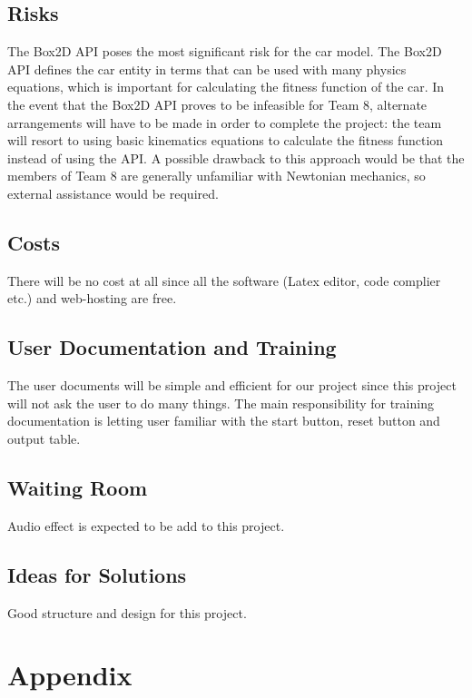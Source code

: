 \documentclass[12pt, titlepage]{article}
\begin{document}
\subsection{Risks}
The Box2D API poses the most signiﬁcant risk for the car model. The Box2D 
API deﬁnes the car entity in terms that can be used with many physics 
equations, which is important for calculating the ﬁtness function of the 
car. In the event that the Box2D API proves to be infeasible for Team 8, 
alternate arrangements will have to be made in order to complete the
project: the team will resort to using basic kinematics equations to calculate 
the ﬁtness function instead of using the API. A possible drawback to this 
approach would be that the members of Team 8 are generally unfamiliar with 
Newtonian mechanics, so external assistance would be required. 

\subsection{Costs}
There will be no cost at all since all the software (Latex editor, code 
complier etc.) and web-hosting are free. 

\subsection{User Documentation and Training}
The user documents will be simple and efficient for our project since this 
project will not ask the user to do many things. The main responsibility for 
training documentation is letting user familiar with the start button, reset 
button and output table.

\subsection{Waiting Room}
Audio effect is expected to be add to this project.

\subsection{Ideas for Solutions}
Good structure and design for this project.






\newpage

\section{Appendix}
\end{document}
